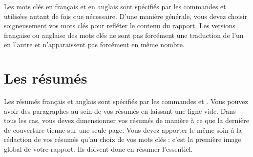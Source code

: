 \documentclass[overfullbox,hideweeklyreports,noseparatecontributorspage,nodate]{polytech}
\begin{document}
Les mots clés en français et en anglais sont spécifiés par les commandes \latexcode{\\motcle} et \latexcode{\\keyword} utilisées autant de fois que nécessaire. D'une manière générale, vous devez choisir soigneusement vos mots clés pour refléter le contenu du rapport. Les versions française ou anglaise des mots clés ne sont pas forcément une traduction de l'un en l'autre et n'apparaissent pas forcément en même nombre.

\begin{latexsource}
\end{latexsource}

\section{Les résumés}

Les résumés français et anglais sont spécifiés par les commandes \latexcode{\\resume} et \latexcode{\\abstract}. Vous pouvez avoir des paragraphes au sein de vos résumés en laissant une ligne vide. Dans tous les cas, vous devez dimensionner vos résumés de manière à ce que la dernière de couverture tienne sur une seule page. Vous devez apporter le même soin à la rédaction de vos résumés qu'au choix de vos mots clés : c'est la première image global de votre rapport. Ils doivent donc en résumer l'essentiel.
\end{document}
